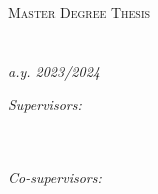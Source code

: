 
\begin{titlepage}
    \begin{center}

        \textsc{\Large Master Degree Thesis}\\[0.5cm] %
        \Large\deptname\\[0.5cm] %
        \Large\facname\\[0.5cm] %
        \textit{\normalsize a.y. 2023/2024} %

        \vfill
        \vfill

        {\huge \bfseries \ttitle\par}\vspace{0.4cm} %
        


        \vfill

        \begin{minipage}[t]{0.4\textwidth}
            \begin{flushleft} \large
                \emph{Supervisors:} \\[0.05cm]
                \supname\\[0.1cm] %
                \cosupname\\[0.1cm] %
                
            \end{flushleft}
        \end{minipage}
        \begin{minipage}[t]{0.4\textwidth}
            \begin{flushright} \large
                \emph{Co-supervisors:} \\[0.05cm]
                \cocosupname\\[0.1cm] %
                \cococosupname\\[0.1cm] %
            

\end{flushright}
\end{minipage}
\end{center}
\end{titlepage}
